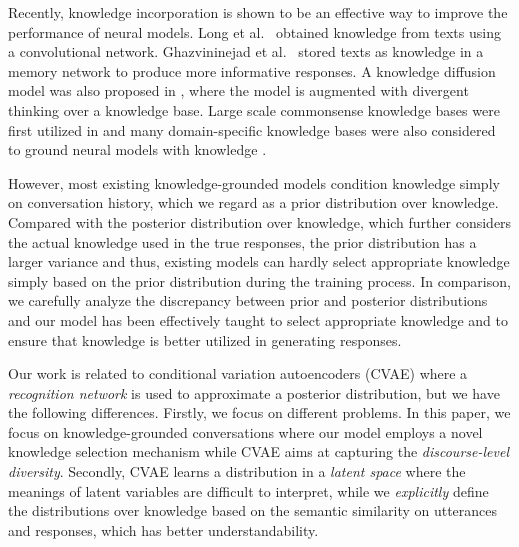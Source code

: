 \documentclass{article}
\begin{document}
Recently,
knowledge incorporation is shown to be an effective way to improve the performance of neural models.
%
Long et al.~ obtained knowledge from texts using a convolutional network.
Ghazvininejad et al.~ stored texts as knowledge in a memory network to produce more informative responses.
A knowledge diffusion model was also proposed in \cite{liu2018knowledge},
where the model is augmented with divergent thinking over a knowledge base.
Large scale commonsense knowledge bases were first utilized in \cite{zhou2018commonsense} and
many domain-specific knowledge bases were also considered to ground neural models with knowledge \cite{xu2017incorporating,zhu2017flexible,gu2016incorporating}. 

However, most existing knowledge-grounded models condition knowledge simply on conversation history,
which we regard as a prior distribution over knowledge.
Compared with the posterior distribution over knowledge, 
which further considers the actual knowledge used in the true responses,
the prior distribution has a larger variance
and thus, existing models can hardly select appropriate knowledge simply based on the prior distribution during the training process.
In comparison, we carefully analyze the discrepancy between prior and posterior distributions
and
our model has been effectively taught 
to select appropriate knowledge and to ensure that knowledge is better utilized in generating responses.

Our work is related to conditional variation autoencoders (CVAE) \cite{zhao2017learning}
where a \emph{recognition network} is used to approximate a posterior distribution,
but we have the following differences.
Firstly, we focus on different problems.
In this paper, we focus on knowledge-grounded conversations where our model employs a novel knowledge selection mechanism
while CVAE aims at capturing the \emph{discourse-level diversity}. 
Secondly,
CVAE learns a distribution in a \emph{latent space}
where the meanings of latent variables are difficult to interpret,
while we \emph{explicitly} define the distributions over knowledge based on the semantic similarity on utterances and responses,
which has better understandability.
\end{document}
